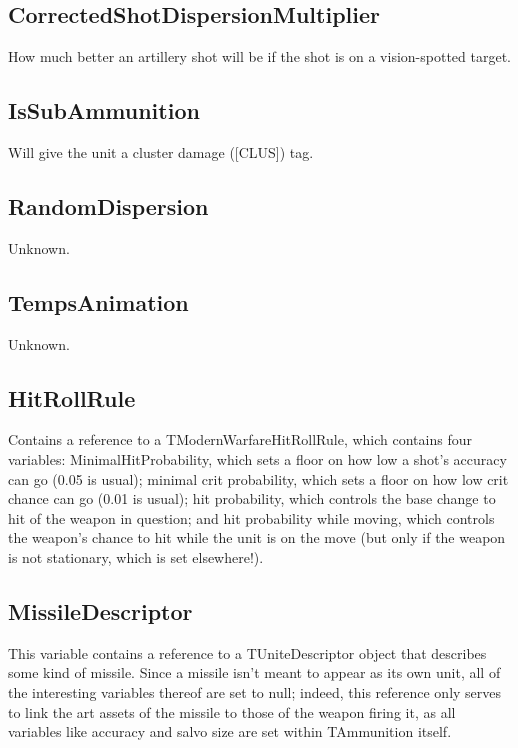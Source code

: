 \documentclass{article}
\begin{document}
\subsection{CorrectedShotDispersionMultiplier}

How much better an artillery shot will be if the shot is on a vision-spotted target.

\subsection{IsSubAmmunition}

Will give the unit a cluster damage ([CLUS]) tag.

\subsection{RandomDispersion}

Unknown.

\subsection{TempsAnimation}

Unknown.

\subsection{HitRollRule}

Contains a reference to a TModernWarfareHitRollRule, which contains four variables: MinimalHitProbability, which sets a floor on how low a shot's accuracy can go (0.05 is usual); minimal crit probability, which sets a floor on how low crit chance can go (0.01 is usual); hit probability, which controls the base change to hit of the weapon in question; and hit probability while moving, which controls the weapon's chance to hit while the unit is on the move (but only if the weapon is not stationary, which is set elsewhere!).

\subsection{MissileDescriptor}

This variable contains a reference to a TUniteDescriptor object that describes some kind of missile. Since a missile isn't meant to appear as its own unit, all of the interesting variables thereof are set to null; indeed, this reference only serves to link the art assets of the missile to those of the weapon firing it, as all variables like accuracy and salvo size are set within TAmmunition itself.
\end{document}
